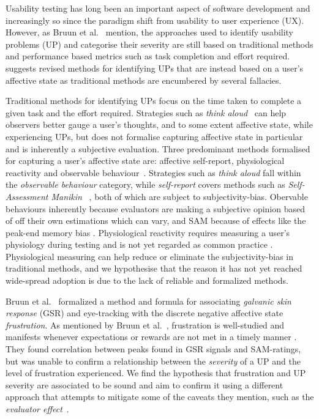 Usability testing has long been an important aspect of software development and
increasingly so since the paradigm shift from usability to user experience (UX).
However, as Bruun et al.~\cite{LH-paper} mention, the approaches used to
identify usability problems (UP) and categorise their severity are still based
on traditional methods and performance based metrics such as task completion and effort required. \cite{LH-paper} suggests revised methods
for identifying UPs that are instead based on a user's affective state as
traditional methods are encumbered by several fallacies.


Traditional methods for identifying UPs focus on the time taken to complete a
given task and the effort required. Strategies such as \textit{think
aloud}~\cite{use_of_TA_and_IDA} can help observers better gauge a user's
thoughts, and to some extent affective state, while experiencing UPs, but does
not formalise capturing affective state in particular and is inherently a
subjective evaluation. Three predominant methods formalised for capturing a
user's affective state are: affective self-report, physiological reactivity and
observable behaviour~\cite{BRADLEY199449}. Strategies such as \textit{think
aloud} fall within the \textit{observable behaviour} category, while
\textit{self-report} covers methods such as \textit{Self-Assessment Manikin}
~\cite{BRADLEY199449}, both of which are subject to
subjectivity-bias. Obervable behaviours inherently because evaluators are making a subjective opinion based of off their own estimations which can vary\cite{eval_effect}, and SAM because of effects like the peak-end memory bias \cite{cockburn_peakend}. Physiological reactivity requires measuring a
user's physiology during testing and is not yet regarded as common practice
.  Physiological measuring can help reduce or
eliminate the subjectivity-bias in traditional methods, and we hypothesise that
the reason it has not yet reached wide-spread adoption is due to the lack of
reliable and formalized methods.

Bruun et al.~\cite{LH-paper} formalized a method and formula for associating
\textit{galvanic skin response} (GSR) and eye-tracking with the discrete
negative affective state \textit{frustration}. As mentioned by Bruun et al.~\cite{LH-paper}, frustration is well-studied
and manifests whenever expectations or rewards are not met in a timely manner
. They found correlation between peaks found in GSR signals and
SAM-ratings, but was unable to confirm a relationship between the
\textit{severity} of a UP and the level of frustration experienced. We find the
hypothesis that frustration and UP severity are associated to be sound and aim
to confirm it using a different approach that attempts to mitigate some of the
caveats they mention, such as the \textit{evaluator effect}~\cite{eval_effect}.

